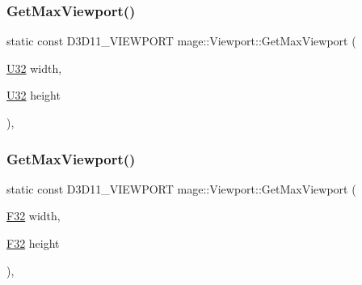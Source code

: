 \hypertarget{classmage_1_1_viewport_a6463b68fb105634e92fef03923860275}{}\label{classmage_1_1_viewport_a6463b68fb105634e92fef03923860275} 
\subsubsection{\texorpdfstring{Get\+Max\+Viewport()}{GetMaxViewport()}\hspace{0.1cm}{\footnotesize\ttfamily [2/5]}}
{\footnotesize\ttfamily static const D3\+D11\+\_\+\+V\+I\+E\+W\+P\+O\+RT mage\+::\+Viewport\+::\+Get\+Max\+Viewport (\begin{DoxyParamCaption}\item[{\hyperlink{namespacemage_a41c104c036fba3756a74e19f793eeaa1}{U32}}]{width,  }\item[{\hyperlink{namespacemage_a41c104c036fba3756a74e19f793eeaa1}{U32}}]{height }\end{DoxyParamCaption})\hspace{0.3cm}{\ttfamily [static]}, {\ttfamily [noexcept]}}

\hypertarget{classmage_1_1_viewport_afa370989bface41f89d1dc11b11ac0bd}{}\label{classmage_1_1_viewport_afa370989bface41f89d1dc11b11ac0bd} 
\subsubsection{\texorpdfstring{Get\+Max\+Viewport()}{GetMaxViewport()}\hspace{0.1cm}{\footnotesize\ttfamily [3/5]}}
{\footnotesize\ttfamily static const D3\+D11\+\_\+\+V\+I\+E\+W\+P\+O\+RT mage\+::\+Viewport\+::\+Get\+Max\+Viewport (\begin{DoxyParamCaption}\item[{\hyperlink{namespacemage_aa97e833b45f06d60a0a9c4fc22ae02c0}{F32}}]{width,  }\item[{\hyperlink{namespacemage_aa97e833b45f06d60a0a9c4fc22ae02c0}{F32}}]{height }\end{DoxyParamCaption})\hspace{0.3cm}{\ttfamily [static]}, {\ttfamily [noexcept]}}

\hypertarget{classmage_1_1_viewport_a04cd0dec1cbb66cfe0a8776870a175d7}{}\label{classmage_1_1_viewport_a04cd0dec1cbb66cfe0a8776870a175d7} 
